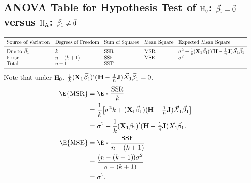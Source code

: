 \subsection*{ANOVA Table for Hypothesis Test of $ \text{H}_0 $: $ \vec{\beta}_1=\vec{0} $ versus $ \text{H}_{\text{A}} $: $ \vec{\beta}_1\ne \vec{0} $}
\[ \begin{array}{lllll}
        \toprule
        \text{Source of Variation}     & \text{Degrees of Freedom} & \text{Sum of Squares} & \text{Mean Square} & \text{Expected Mean Square}                                                                                          \\
        \midrule
        \text{Due to }\Vector{\beta}_1 & k                         & \SSR                  & \MSR               & \sigma^2+\frac{1}{k}(\Matrix{X}_1 \Vector{\beta}_1)'(\Matrix{H}-\tfrac{1}{n}\Matrix{J})\Vector{X}_1 \Vector{\beta}_1 \\
        \text{Error}                   & n-(k+1)                   & \SSE                  & \MSE               & \sigma^2                                                                                                             \\
        \text{Total}                   & n-1                       & \SST                                                                                                                                                              \\
        \bottomrule
    \end{array} \]
Note that under $ \text{H}_0 $, $ \frac{1}{k}(\mathbf{X}_1 \vec{\beta}_1)'(\mathbf{H}-\tfrac{1}{n}\mathbf{J})\vec{X}_1 \vec{\beta}_1=0 $.
\begin{align*}
    \E{\MSR}
     & =\E*{\frac{\SSR}{k}}                                                                                                               \\
     & =\frac{1}{k}\bigl[\sigma^2 k+(\Matrix{X}_1 \Vector{\beta}_1)(\Matrix{H}-\tfrac{1}{n}\Matrix{J})\Vector{X}_1 \Vector{\beta}_1\bigr] \\
     & =\sigma^2+\frac{1}{k}(\Matrix{X}_1 \Vector{\beta}_1)'(\Matrix{H}-\tfrac{1}{n}\Matrix{J})\Vector{X}_1 \Vector{\beta}_1.             \\
    \E{\MSE}
     & =\E*{\frac{\SSE}{n-(k+1)}}                                                                                                         \\
     & =\frac{(n-(k+1))\sigma^2}{n-(k+1)}                                                                                                 \\
     & =\sigma^2.
\end{align*}
